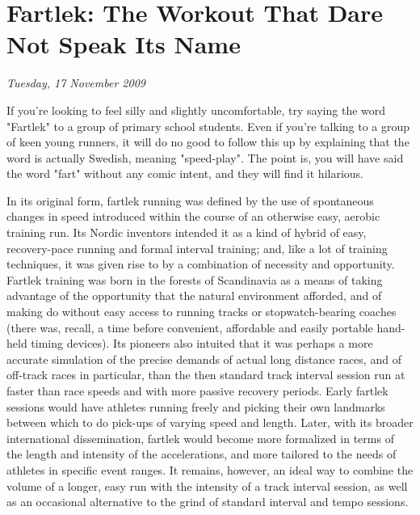\chapter{Fartlek: The Workout That Dare Not Speak Its Name}
\textit{Tuesday, 17 November 2009}
\bigskip

If you're looking to feel silly and slightly uncomfortable, try saying the word "Fartlek" to a group of primary school students. Even if you're talking to a group of keen young runners, it will do no good to follow this up by explaining that the word is actually Swedish, meaning "speed-play". The point is, you will have said the word "fart" without any comic intent, and they will find it hilarious.

In its original form, fartlek running was defined by the use of spontaneous changes in speed introduced within the course of an otherwise easy, aerobic training run. Its Nordic inventors intended it as a kind of hybrid of easy, recovery-pace running and formal interval training; and, like a lot of training techniques, it was given rise to by a combination of necessity and opportunity. Fartlek training was born in the forests of Scandinavia as a means of taking advantage of the opportunity that the natural environment afforded, and of making do without easy access to running tracks or stopwatch-bearing coaches (there was, recall, a time before convenient, affordable and easily portable hand-held timing devices). Its pioneers also intuited that it was perhaps a more accurate simulation of the precise demands of actual long distance races, and of off-track races in particular, than the then standard track interval session run at faster than race speeds and with more passive recovery periods. Early fartlek sessions would have athletes running freely and picking their own landmarks between which to do pick-ups of varying speed and length. Later, with its broader international dissemination, fartlek would become more formalized in terms of the length and intensity of the accelerations, and more tailored to the needs of athletes in specific event ranges. It remains, however, an ideal way to combine the volume of a longer, easy run with the intensity of a track interval session, as well as an occasional alternative to the grind of standard interval and tempo sessions.

